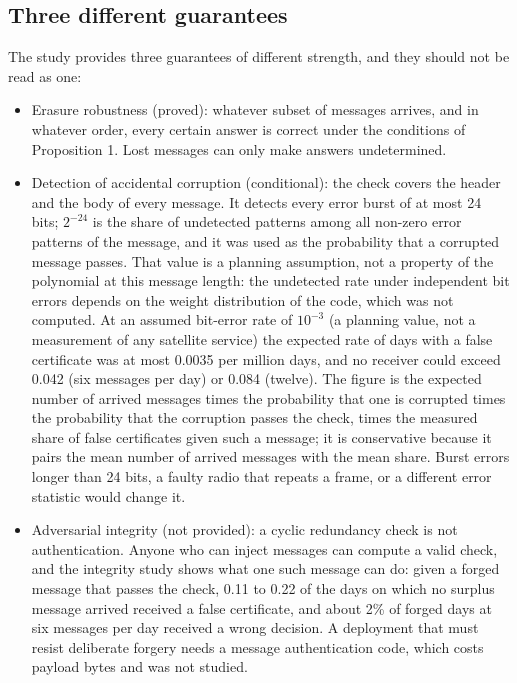 \subsection{Three different guarantees}
The study provides three guarantees of different strength, and they should not be read as one:
\begin{itemize}
  \item Erasure robustness (proved): whatever subset of messages arrives, and in whatever order, every certain answer is correct under the conditions of Proposition 1. Lost messages can only make answers undetermined.
  \item Detection of accidental corruption (conditional): the check covers the header and the body of every message. It detects every error burst of at most 24 bits; $2^{-24}$ is the share of undetected patterns among all non-zero error patterns of the message, and it was used as the probability that a corrupted message passes. That value is a planning assumption, not a property of the polynomial at this message length: the undetected rate under independent bit errors depends on the weight distribution of the code, which was not computed. At an assumed bit-error rate of $10^{-3}$ (a planning value, not a measurement of any satellite service) the expected rate of days with a false certificate was at most 0.0035 per million days, and no receiver could exceed 0.042 (six messages per day) or 0.084 (twelve). The figure is the expected number of arrived messages times the probability that one is corrupted times the probability that the corruption passes the check, times the measured share of false certificates given such a message; it is conservative because it pairs the mean number of arrived messages with the mean share. Burst errors longer than 24 bits, a faulty radio that repeats a frame, or a different error statistic would change it.
  \item Adversarial integrity (not provided): a cyclic redundancy check is not authentication. Anyone who can inject messages can compute a valid check, and the integrity study shows what one such message can do: given a forged message that passes the check, 0.11 to 0.22 of the days on which no surplus message arrived received a false certificate, and about 2\% of forged days at six messages per day received a wrong decision. A deployment that must resist deliberate forgery needs a message authentication code, which costs payload bytes and was not studied.
\end{itemize}

